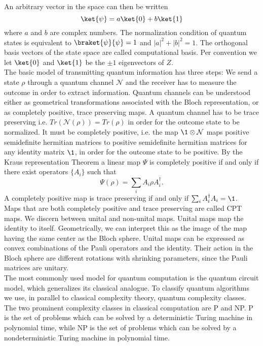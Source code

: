 An arbitrary vector in the space can then be written \[
\ket{\psi} = a\ket{0}+b\ket{1}
\]
where $a$ and $b$ are complex numbers.
The normalization condition of quantum states is equivalent to $\braket{\psi}{\psi}=1$ and $ \left| a \right|^2+\left| b \right|^2=1$.
The orthogonal basis vectors of the state space are called computational basis.
Per convention we let $\ket{0}$ and $\ket{1}$ be the $\pm 1$ eigenvectors of $Z$.\\
The basic model of transmitting quantum information has three steps:
We send a state $\rho$ through a quantum channel $\mathcal{N}$ and the receiver has to measure the outcome in order to extract information.
Quantum channels can be understood either as geometrical transformations associated with the Bloch representation, or as completely positive, trace preserving maps.
A quantum channel has to be trace preserving i.e. $Tr(\mathcal{N}(\rho))=Tr(\rho)$ in order for the outcome state to be normalized.
It must be completely positive, i.e. the map $\1\otimes\mathcal{N}$ maps positive semidefinite hermitian matrices to positive semidefinite hermitian matrices for any identity matrix $\1$, in order for the outcome state to be positive.
By the Kraus representation Theorem \cite{choi75} a linear map $\Psi$ is completely positive if and only if there exist operators $ \{A_i\} $ such that \[
\Psi\left(\rho\right)=\sum_{i}A_i\rho A_i^{\dagger}
.\]
A completely positive map is trace preserving if and only if $\sum_{i} A_i^{\dagger}A_i = \1$.\\
Maps that are both completely positive and trace preserving are called CPT maps.
We discern between unital and non-unital maps.
Unital maps map the identity to itself.
Geometrically, we can interpret this as the image of the map having the same center as the Bloch sphere.
Unital maps can be expressed as convex combinations of the Pauli operators and the identity.
Their action in the Bloch sphere are different rotations with shrinking parameters, since the Pauli matrices are unitary.\cite{imre12}\\
The most commonly used model for quantum computation is the quantum circuit model, which generalizes its classical analogue.
To classify quantum algorithms we use, in parallel to classical complexity theory, quantum complexity classes.
The two prominent complexity classes in classical computation are P and NP.
P is the set of problems which can be solved by a deterministic Turing machine in polynomial time, while NP is the set of problems which can be solved by a nondeterministic Turing machine in polynomial time.
